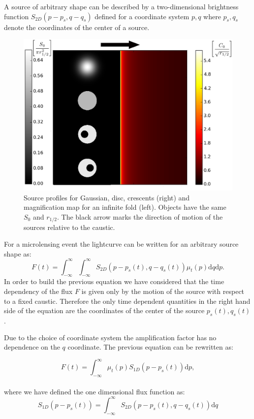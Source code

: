 \documentclass[usenatbib]{mn2e}
\begin{document}
A source of arbitrary shape can be described by a two-dimensional brightness function $S_{2D}(p - p_s, q - q_s)$ defined for a coordinate system $p,q$ where $p_s, q_s$ denote the coordinates of the center of a source.

\begin{figure}
\includegraphics[width = .49\textwidth]{figures/infinite_fold_ar.eps}
\caption{\label{fig:infinite_fold} Source profiles for Gaussian, disc,
  crescents (right) and magnification map for an infinite fold
  (left). Objects have the same $S_{0}$ and $r_{1/2}$. The black arrow marks the direction of motion of the
sources relative to the caustic.}
\end{figure}

For a microlensing event the lightcurve can be written for an
arbitrary source shape as:
\begin{equation}
 F(t) = \int_{-\infty}^\infty \int_{-\infty}^\infty S_{2D}(p-p_s(t), q-q_s(t)) \mu_t(p) \mathrm{d}q \mathrm{d}p.
 \label{eqn:ft2d}
\end{equation}
In order to build the previous equation we have considered that the
time dependency of the flux $F$ is given only by the motion of the
source with respect to a fixed caustic. Therefore the only time
dependent quantities in the right hand side of the equation are the
coordinates of the center of the source $p_s(t),q_s(t)$.

Due to the choice of coordinate system the amplification factor 
has no dependence on the $q$ coordinate. The previous equation can be rewritten as:

\begin{equation}
 F(t) 
= \int_{-\infty}^\infty  \mu_t(p) S_{1D}\left(p-p_s(t)\right) \mathrm{d}p,
\label{eqn:ft}
\end{equation}
\\
where we have defined the one dimensional flux function as:
\begin{equation}
 S_{1D}(p-p_s(t)) = \int_{-\infty}^\infty S_{2D}(p-p_s(t), q-q_s(t)) \mathrm{d}q
\end{equation}
\end{document}
